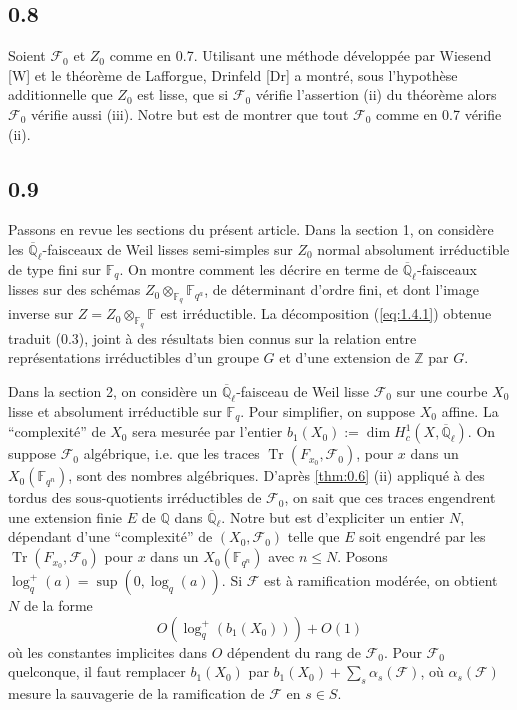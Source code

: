 \documentclass[11pt,a4paper]{article}
\theoremstyle{plain}
\theoremstyle{definition}
\DeclareMathOperator{\tr}{Tr}
\begin{document}
\subsection*{0.8}

Soient $\mathcal{F}_0$ et $Z_0$ comme en 0.7. Utilisant une m\'ethode d\'evelopp\'ee par Wiesend [W] et le th\'eor\`eme de Lafforgue, Drinfeld [Dr] a montr\'e, sous l'hypoth\`ese additionnelle que $Z_0$ est lisse, que si $\mathcal{F}_0$ v\'erifie l'assertion (ii) du th\'eor\`eme alors $\mathcal{F}_0$ v\'erifie aussi (iii). Notre but est de montrer que tout $\mathcal{F}_0$ comme en 0.7 v\'erifie (ii).

\subsection*{0.9}

Passons en revue les sections du pr\'esent article. Dans la section 1, on consid\`ere les $\overline{\mathbb{Q}}_\ell$-faisceaux de Weil lisses semi-simples sur $Z_0$ normal absolument irr\'eductible de type fini sur $\mathbb{F}_q$. On montre comment les d\'ecrire en terme de $\overline{\mathbb{Q}}_\ell$-faisceaux lisses sur des sch\'emas $Z_0 \otimes_{\mathbb{F}_q} \mathbb{F}_{q^a}$, de d\'eterminant d'ordre fini, et dont l'image inverse sur $Z = Z_0 \otimes_{\mathbb{F}_q} \mathbb{F}$ est irr\'eductible. La d\'ecomposition (\ref{eq:1.4.1}) obtenue traduit (0.3), joint \`a des r\'esultats bien connus sur la relation entre repr\'esentations irr\'eductibles d'un groupe $G$ et d'une extension de $\mathbb{Z}$ par $G$.

Dans la section 2, on consid\`ere un $\overline{\mathbb{Q}}_\ell$-faisceau de Weil lisse $\mathcal{F}_0$ sur une courbe $X_0$ lisse et absolument irr\'eductible sur $\mathbb{F}_q$. Pour simplifier, on suppose $X_0$ affine. La ``complexit\'e'' de $X_0$ sera mesur\'ee par l'entier $b_1(X_0) := \dim H_c^1(X, \overline{\mathbb{Q}}_\ell)$. On suppose $\mathcal{F}_0$ alg\'ebrique, i.e. que les traces $\tr(F_{x_0},\mathcal{F}_0)$, pour $x$ dans un $X_0(\mathbb{F}_{q^n})$, sont des nombres alg\'ebriques. D'apr\`es \ref{thm:0.6} (ii) appliqu\'e \`a des tordus des sous-quotients irr\'eductibles de $\mathcal{F}_0$, on sait que ces traces engendrent une extension finie $E$ de $\mathbb{Q}$ dans $\overline{\mathbb{Q}}_\ell$. Notre but est d'expliciter un entier $N$, d\'ependant d'une ``complexit\'e'' de $(X_0,\mathcal{F}_0)$ telle que $E$ soit engendr\'e par les $\tr(F_{x_0},\mathcal{F}_0)$ pour $x$ dans un $X_0(\mathbb{F}_{q^n})$ avec $n \leq N$. Posons $\log_q^+(a) = \sup(0, \log_q(a))$. Si $\mathcal{F}$ est \`a ramification mod\'er\'ee, on obtient $N$ de la forme
\begin{equation}\label{eq:0.9.1}
O(\log_q^+(b_1(X_0))) + O(1)
\end{equation}
o\`u les constantes implicites dans $O$ d\'ependent du rang de $\mathcal{F}_0$. Pour $\mathcal{F}_0$ quelconque, il faut remplacer $b_1(X_0)$ par $b_1(X_0) + \sum_s \alpha_s(\mathcal{F})$, o\`u $\alpha_s(\mathcal{F})$ mesure la sauvagerie de la ramification de $\mathcal{F}$ en $s \in S$.
\end{document}
